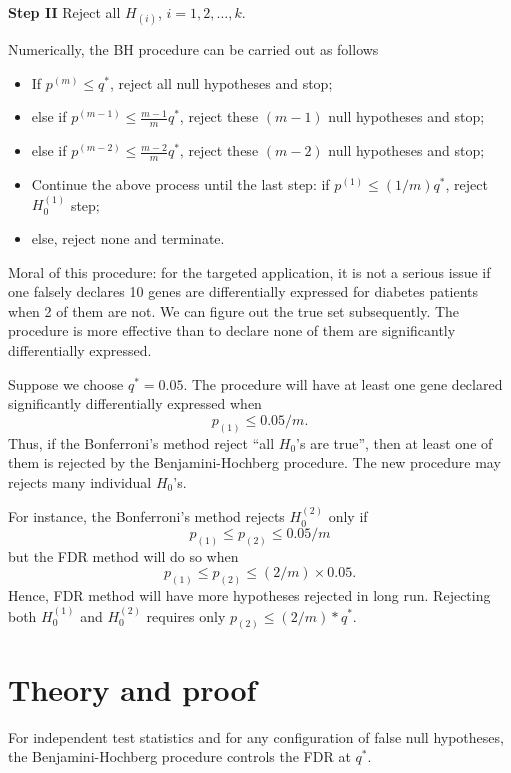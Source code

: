 \vs\vs \noindent
{\bf Step II}
Reject all $H_{(i)}$, $i=1, 2, \ldots, k$.


\vs\vs\vs
\noindent
Numerically, the BH procedure can be carried out as follows

\begin{itemize}
\item
If $p^{(m)} \leq q^*$, reject all null hypotheses and stop;

\item
else if $p^{(m-1)} \leq \frac{m-1}{m}q^*$, reject these $(m-1)$ null hypotheses and stop;

\item
else if $p^{(m-2)} \leq \frac{m-2}{m}q^*$, reject these $(m-2)$ null hypotheses and stop;

\item
Continue the above process until the last step: 
if $p^{(1)} \leq (1/m)q^*$, reject $H_0^{(1)}$ step;

\item
else, reject none and terminate.
\end{itemize}


Moral of this procedure: for the targeted application, it is not a
serious issue if one falsely declares 10 genes are differentially
expressed for diabetes patients when 2 of them are not.
We can figure out the true set subsequently. The procedure
is more effective than to declare none of them are significantly
differentially expressed.

Suppose we choose $q^* = 0.05$. The procedure
will have at least one gene declared significantly differentially expressed
when
\[
p_{(1)} \leq 0.05/m.
\]
Thus, if the Bonferroni's method reject ``all $H_0$'s are true'',
then at least one of them is rejected by the Benjamini-Hochberg
procedure. The new procedure may rejects many
individual $H_0$'s.

For instance, the Bonferroni's method rejects $H_0^{(2)}$ only if
\[
p_{(1)} \leq p_{(2)} \leq 0.05/m
\]
but the FDR method will do so when
\[
p_{(1)} \leq p_{(2)} \leq (2/m) \times 0.05.
\]
Hence, FDR method will have more hypotheses rejected
in long run. Rejecting both $H_0^{(1)}$ and $H_0^{(2)}$
requires only $p_{(2)} \leq (2/m)*q^*$. 


\section{Theory and proof}

\begin{theorem}
For independent test statistics and for any configuration of false 
null hypotheses, the Benjamini-Hochberg procedure controls the FDR at $q^*$.
\end{theorem}

